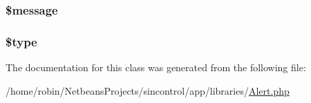 \subsubsection[{\$message}]{\setlength{\rightskip}{0pt plus 5cm}\$message\hspace{0.3cm}{\ttfamily [private]}}\label{class_alert_abf17cb2dba2ed17cb28aa5f37deb5293}
\hypertarget{class_alert_a9a4a6fba2208984cabb3afacadf33919}{}
\subsubsection[{\$type}]{\setlength{\rightskip}{0pt plus 5cm}\$type\hspace{0.3cm}{\ttfamily [private]}}\label{class_alert_a9a4a6fba2208984cabb3afacadf33919}


The documentation for this class was generated from the following file\+:\begin{DoxyCompactItemize}
\item 
/home/robin/\+Netbeans\+Projects/sincontrol/app/libraries/\hyperlink{_alert_8php}{Alert.\+php}\end{DoxyCompactItemize}
